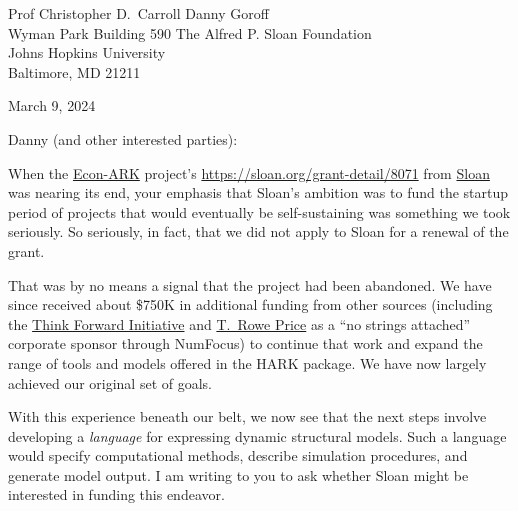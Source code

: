 \documentclass[11pt,pdftex,letterpaper]{article}
\begin{document}
	
\begin{singlespace}
	Prof Christopher D.\ Carroll \hfill Danny Goroff\\
	Wyman Park Building 590 \hfill The Alfred P. Sloan Foundation\\
	Johns Hopkins University \hfill %
        \\
	Baltimore, MD 21211 \hfill %
	
	\vspace{0.2cm}
	
	March 9, 2024
	
\end{singlespace}

\vspace{0.3cm}

Danny (and other interested parties):

When the \href{http://www.econ-ark.org}{Econ-ARK} project's \href{generous founding grant}{https://sloan.org/grant-detail/8071} from \href{https://sloan.org}{Sloan} was nearing its end, your emphasis that Sloan's ambition was to fund the startup period of projects that would eventually be self-sustaining was something we took seriously.  So seriously, in fact, that we did not apply to Sloan for a renewal of the grant. 

That was by no means a signal that the project had been abandoned. We have since received about \$750K in additional funding from other sources (including the \href{https://inomics.com/institution/think-forward-initiative-1258337}{Think Forward Initiative} and \href{https://www.troweprice.com/en}{T.\ Rowe Price} as a ``no strings attached'' corporate sponsor through NumFocus) to continue that work and expand the range of tools and models offered in the HARK package.  We have now largely achieved our original set of goals.

With this experience beneath our belt, we now see that the next steps involve developing a \textit{language} for expressing dynamic structural models.  Such a language would specify computational  methods, describe simulation procedures, and generate model output. I am writing to you to ask whether Sloan might be interested in funding this endeavor.
\end{document}
